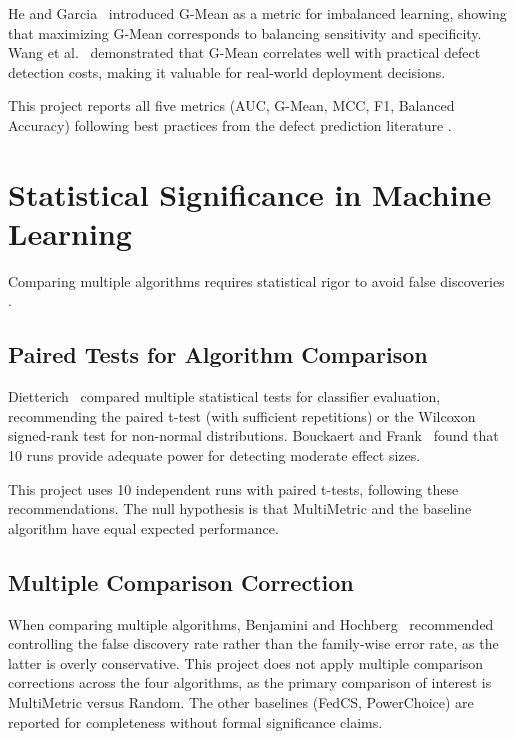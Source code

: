 He and Garcia~\citep{he2009learning} introduced G-Mean as a metric for imbalanced learning, showing that maximizing G-Mean corresponds to balancing sensitivity and specificity. Wang et al.~\citep{wang2016gmean} demonstrated that G-Mean correlates well with practical defect detection costs, making it valuable for real-world deployment decisions.

This project reports all five metrics (AUC, G-Mean, MCC, F1, Balanced Accuracy) following best practices from the defect prediction literature \citep{herbold2018comparison}.

\section{Statistical Significance in Machine Learning}

Comparing multiple algorithms requires statistical rigor to avoid false discoveries \citep{demsar2006statistical}.

\subsection{Paired Tests for Algorithm Comparison}

Dietterich~\citep{dietterich1998approximate} compared multiple statistical tests for classifier evaluation, recommending the paired t-test (with sufficient repetitions) or the Wilcoxon signed-rank test for non-normal distributions. Bouckaert and Frank~\citep{bouckaert2004evaluating} found that 10 runs provide adequate power for detecting moderate effect sizes.

This project uses 10 independent runs with paired t-tests, following these recommendations. The null hypothesis is that MultiMetric and the baseline algorithm have equal expected performance.

\subsection{Multiple Comparison Correction}

When comparing multiple algorithms, Benjamini and Hochberg~\citep{benjamini1995controlling} recommended controlling the false discovery rate rather than the family-wise error rate, as the latter is overly conservative. This project does not apply multiple comparison corrections across the four algorithms, as the primary comparison of interest is MultiMetric versus Random. The other baselines (FedCS, PowerChoice) are reported for completeness without formal significance claims.

